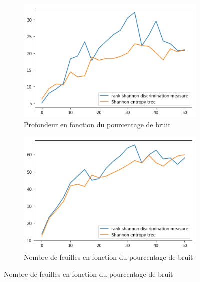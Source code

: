 \documentclass[a4paper]{article}
\begin{document}
\begin{figure}[H]
    \begin{subfigure}[c]{0.46\textwidth}
        \centering
        \includegraphics[width=\textwidth]{images/depth_2.png}
        \caption{Profondeur en fonction du pourcentage de bruit}
    \end{subfigure}
    \begin{subfigure}[c]{0.46\textwidth}
        \centering
        \includegraphics[width=\textwidth]{images/leaves_2.png}
        \caption{Nombre de feuilles en fonction du pourcentage de bruit}
    \end{subfigure}


\end{figure}
\end{document}
